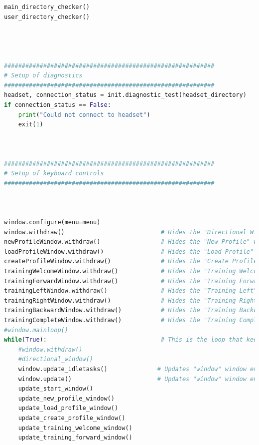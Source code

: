 \documentclass[conference]{IEEEtran}
\begin{document}
\begin{lstlisting}[language=Python, caption=GUI CODE, label=gui_code]
main_directory_checker()
user_directory_checker()




###########################################################
# Setup of diagnostics
###########################################################
headset, connection_status = init.diagnostic_test(headset_directory)
if connection_status == False:
    print("Could not connect to headset")
    exit(1)



###########################################################
# Setup of keyboard controls
###########################################################



window.configure(menu=menu)
window.withdraw()                           # Hides the "Directional Window" until needed
newProfileWindow.withdraw()                 # Hides the "New Profile" window until needed
loadProfileWindow.withdraw()                # Hides the "Load Profile" window until needed
createProfileWindow.withdraw()              # Hides the "Create Profile" window until needed
trainingWelcomeWindow.withdraw()            # Hides the "Training Welcome" window until needed
trainingForwardWindow.withdraw()            # Hides the "Training Forward" window until needed
trainingLeftWindow.withdraw()               # Hides the "Training Left" window until needed
trainingRightWindow.withdraw()              # Hides the "Training Right" window until needed
trainingBackwardWindow.withdraw()           # Hides the "Training Backward" window until needed
trainingCompleteWindow.withdraw()           # Hides the "Training Complete" window until needed
#window.mainloop()
while(True):                                # This is the loop that keeps the GUI frames generating
    #window.withdraw()
    #directional_window()
    window.update_idletasks()              # Updates "window" window even if not called upon to prevent errors 
    window.update()                        # Updates "window" window even if not called upon to prevent errors 
    update_start_window()
    update_new_profile_window()
    update_load_profile_window()
    update_create_profile_window()
    update_training_welcome_window()
    update_training_forward_window()


    \end{lstlisting}
    
\end{document}
